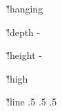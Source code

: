 
\installframedlocator \v!hanging %
  {\dp\framebox\ht\framebox
   \ht\framebox\zeropoint}

\installframedlocator \v!depth
  {\scratchdimen\ht\framebox
   \advance\scratchdimen -\strutdp
   \ht\framebox\scratchdimen
   \dp\framebox\strutdp
   \box\framebox}

\installframedlocator \v!height
  {\scratchdimen\ht\framebox
   \advance\scratchdimen -\strutht
   \ht\framebox\strutht
   \dp\framebox\scratchdimen
   \box\framebox}

\installframedlocator \v!high
  {\doprelocframedbox\strutht
   \setbox\framebox\hbox{\lower\scratchskip\box\framebox}%
   \ht\framebox\strutht
   \dp\framebox\strutdp
   \hbox{\box\framebox}}

\installframedlocator \v!line
  {\setbox\framebox\hbox{\lower.5\ht\framebox\box\framebox}%
   \ht\framebox.5\lineheight
   \dp\framebox.5\lineheight
   \hbox{\box\framebox}}


